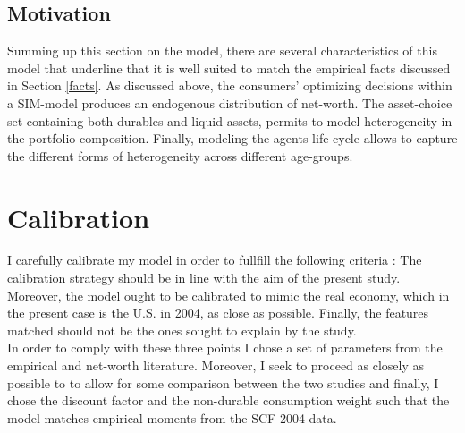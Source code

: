 \documentclass[a4paper,12pt,legno]{article}
\begin{document}
\subsection{Motivation}
Summing up this section on the model, there are several characteristics of this model that underline that it is well suited to match the empirical facts discussed in Section \ref{facts}. As discussed above, the consumers' optimizing decisions within a SIM-model produces an endogenous distribution of net-worth. The asset-choice set containing both durables and liquid assets, permits to model heterogeneity in the portfolio composition. Finally, modeling the agents life-cycle allows to capture the different forms of heterogeneity across different age-groups. 

\section{Calibration}

I carefully calibrate my model in order to fullfill the following criteria \citep{kydland1996computational}: The calibration strategy should be in line with the aim of the present study. Moreover, the model ought to be calibrated to mimic the real economy, which in the present case is the U.S. in 2004, as close as possible. Finally, the features matched should not be the ones sought to explain by the study. \\
In order to comply with these three points I chose a set of parameters from the empirical and net-worth literature. Moreover, I seek to proceed as closely as possible to \cite{hintermaier2011} to allow for some comparison between the two studies and finally, I chose the discount factor and the non-durable consumption weight such that the model matches empirical moments from the SCF 2004 data. 
\end{document}
